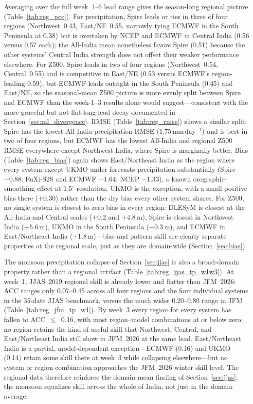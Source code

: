 \documentclass[11pt,a4paper]{article}
\begin{document}
Averaging over the full week~1--6 lead range gives the season-long regional
picture (Table~\ref{tab:reg_pcc}). For precipitation, Spire leads or ties in
three of four regions (Northwest~0.43, East/NE~0.55, narrowly tying ECMWF in
the South Peninsula at 0.38) but is overtaken by NCEP and ECMWF in Central
India (0.56 versus 0.57 each); the All-India mean nonetheless favors Spire
(0.51) because the other systems' Central India strength does not offset
their weaker performance elsewhere. For Z500, Spire leads in two of four
regions (Northwest~0.54, Central~0.55) and is competitive in East/NE
(0.53 versus ECMWF's region-leading 0.59), but ECMWF leads outright in the
South Peninsula (0.45) and East/NE, so the seasonal-mean Z500 picture is
more evenly split between Spire and ECMWF than the week-1--3 results alone
would suggest---consistent with the more graceful-but-not-flat long-lead
decay documented in Section~\ref{sec:ml_divergence}. RMSE
(Table~\ref{tab:reg_rmse}) shows a similar split: Spire has the lowest
All-India precipitation RMSE (1.75\,mm\,day$^{-1}$) and is best in two of
four regions, but ECMWF has the lowest All-India and regional Z500 RMSE
everywhere except Northwest India, where Spire is marginally better. Bias
(Table~\ref{tab:reg_bias}) again shows East/Northeast India as the region
where every system except UKMO under-forecasts precipitation substantially
(Spire $-0.88$; FuXi-S2S and ECMWF $-1.64$; NCEP $-1.33$), a known
orographic-smoothing effect at $1.5^{\circ}$ resolution; UKMO is the
exception, with a small positive bias there ($+0.30$) rather than the dry
bias every other system shares. For Z500, no single system is closest to
zero bias in every region: DLESyM is closest at the All-India and Central
scales ($+0.2$ and $+4.8$\,m), Spire is closest in Northwest India
($+5.6$\,m), UKMO in the South Peninsula ($-0.3$\,m), and ECMWF in
East/Northeast India ($+1.8$\,m)---bias and pattern skill are clearly
separate properties at the regional scale, just as they are domain-wide
(Section~\ref{sec:bias}).




The monsoon precipitation collapse of Section~\ref{sec:jjas} is also a
broad-domain property rather than a regional artifact
(Table~\ref{tab:reg_jjas_tp_w1w3}). At week~1, JJAS~2019 regional skill is
already lower and flatter than JFM~2026: ACC ranges only 0.07--0.45 across
all four regions and the four individual systems in the 35-date JJAS
benchmark, versus the much wider 0.20--0.80 range in JFM
(Table~\ref{tab:reg_jfm_tp_w1}). By week~3 every
region for every system has fallen to ACC~$\le$~0.16, with most
region--model combinations at or below zero; no region retains the kind of
useful skill that Northwest, Central, and East/Northeast India still show in
JFM~2026 at the same lead. East/Northeast India is a partial, model-dependent
exception---ECMWF (0.16) and UKMO (0.14) retain some skill there at week~3
while collapsing elsewhere---but no system or region combination approaches
the JFM~2026 winter skill level. The regional data therefore reinforce the
domain-mean finding of Section~\ref{sec:jjas}: the monsoon equalizes skill
across the whole of India, not just in the domain average.

\end{document}
